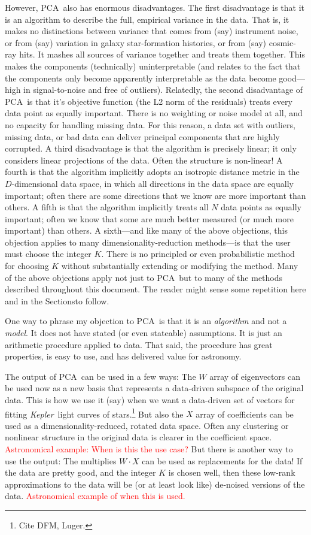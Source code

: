 \documentclass[12pt, twoside, letterpaper]{article}
\newcommand{\sectionnames}{Sections}
\newcommand{\acronym}[1]{{\small{#1}}}
\newcommand{\PCA}{\acronym{PCA}}
\newcommand{\project}[1]{\textsl{#1}}
\newcommand{\Kepler}{\project{Kepler}}
\newcommand{\todo}[1]{\textcolor{red}{#1}}  %
\begin{document}
However, \PCA\ also has enormous disadvantages.
The first disadvantage is that it is an algorithm to describe the full,
empirical variance in the data.
That is, it makes no distinctions between variance that comes from (say)
instrument noise, or from (say) variation in galaxy star-formation histories,
or from (say) cosmic-ray hits.
It mashes all sources of variance together and treats them together.
This makes the components (technically) uninterpretable (and relates to the
fact that the components only become apparently interpretable as the data become good---high
in signal-to-noise and free of outliers).
Relatedly, the second disadvantage of \PCA\ is that it's objective function
(the L2 norm of the residuals) treats every data point
as equally important.
There is no weighting or noise model at all, and no capacity for handling
missing data.
For this reason, a data set with outliers, missing data, or bad data can deliver
principal components that are highly corrupted.
A third disadvantage is that the algorithm is precisely linear; it only
considers linear projections of the data.
Often the structure is non-linear!
A fourth is that the algorithm implicitly adopts an isotropic distance metric
in the $D$-dimensional data space, 
in which all directions in the data space are equally important; often there
are some directions that we know are more important than others.
A fifth is that the algorithm implicitly treats all $N$ data points as equally
important; often we know that some are much better measured (or much more important)
than others.
A sixth---and like many of the above objections, this objection applies to
many dimensionality-reduction methods---is that the user must choose the integer
$K$.
There is no principled or even probabilistic method for choosing $K$ without
substantially extending or modifying the method.
Many of the above objections apply not just to \PCA\ but to many of the methods
described throughout this document.
The reader might sense some repetition here and in the \sectionnames to follow.

One way to phrase my objection to \PCA\ is that it is an \emph{algorithm}
and not a \emph{model}.
It does not have stated (or even stateable) assumptions.
It is just an arithmetic procedure applied to data.
That said, the procedure has great properties, is easy to use, and has
delivered value for astronomy.

The output of \PCA\ can be used in a few ways:
The $W$ array of eigenvectors can be used now as a new basis that represents a
data-driven subspace of the original data.
This is how we use it (say) when we want a data-driven set of vectors for fitting
\Kepler\ light curves of stars.\footnote{Cite DFM, Luger.}
But also the $X$ array of coefficients can be used as a dimensionality-reduced,
rotated data space.
Often any clustering or nonlinear structure in the original data is clearer in
the coefficient space.
\todo{Astronomical example: When is this the use case?}
But there is another way to use the output:
The multiplies $W\cdot X$ can be used as replacements for the data!
If the data are pretty good, and the integer $K$ is chosen well, then these
low-rank approximations to the data will be (or at least look like) de-noised
versions of the data.
\todo{Astronomical example of when this is used.}
\end{document}
